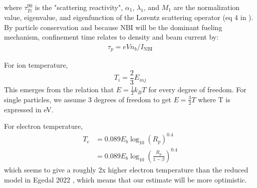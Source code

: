 where $\tau^{90}_{Ti}$ is the "scattering reactivity", $\alpha_1$, $\lambda_1$, and $M_1$ are the normalization value, eigenvalue, and eigenfunction of the Lorentz scattering operator (eq 4 in \cite{Egedal_2022}). 
By particle conservation and because NBI will be the dominant fueling mechanism, confinement time relates to density and beam current by:
\begin{align}
    \tau_p = e V n_b / I_\text{NBI}
\end{align}

For ion temperature, %
\begin{equation}
    T_i = \frac{2}{3} E_{inj}
\end{equation}
This emerges from the relation that $E=\frac{1}{2}k_BT$ for every degree of freedom. For single particles, we assume 3 degrees of freedom to get $E=\frac{3}{2}T$ where T is expressed in eV. 

For electron temperature, %
\begin{align}
    T_e &= 0.089 E_b \log_{10} \left( R_p \right)^{0.4} \\
    &= 0.089 E_b \log_{10} \left(\frac{R_p}{1-\beta} \right)^{0.4}
\end{align}
which seems to give a roughly 2x higher electron temperature than the reduced model in Egedal 2022 \cite{Egedal_2022}, which means that our estimate will be more optimistic.

